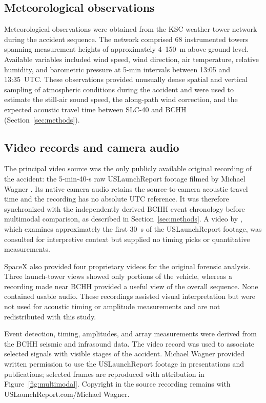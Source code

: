 \documentclass[]{seismica}
\begin{document}
\subsection{Meteorological observations}

Meteorological observations were obtained from the KSC weather-tower network
during the accident sequence. The network comprised 68 instrumented towers
spanning measurement heights of approximately 4--150~m above ground level.
Available variables included wind speed, wind direction, air temperature,
relative humidity, and barometric pressure at 5-min intervals between 13:05
and 13:35~UTC. These observations provided unusually dense spatial and vertical
sampling of atmospheric conditions during the accident and were used to
estimate the still-air sound speed, the along-path wind correction, and the
expected acoustic travel time between SLC-40 and BCHH
(Section~\ref{sec:methods}).


\subsection{Video records and camera audio}

The principal video source was the only publicly available original recording
of the accident: the 5-min-40-s raw USLaunchReport footage filmed by Michael
Wagner \citep{uslaunchreport_amos6_video_2016}. Its native camera audio retains
the source-to-camera acoustic travel time and the recording has no absolute UTC
reference. It was therefore synchronized with the independently derived BCHH
event chronology before multimodal comparison, as described in
Section~\ref{sec:methods}. A video by \citet{manley_spacex_explosion_2016},
which examines approximately the first 30~s of the USLaunchReport footage, was
consulted for interpretive context but supplied no timing picks or quantitative
measurements.

SpaceX also provided four proprietary videos for the original forensic
analysis. Three launch-tower views showed only portions of the vehicle, whereas
a recording made near BCHH provided a useful view of the overall sequence.
None contained usable audio. These recordings assisted visual interpretation
but were not used for acoustic timing or amplitude measurements and are not
redistributed with this study.

Event detection, timing, amplitudes, and array measurements were derived from
the BCHH seismic and infrasound data. The video record was used to associate
selected signals with visible stages of the accident. Michael Wagner provided
written permission to use the USLaunchReport footage in presentations and
publications; selected frames are reproduced with attribution in
Figure~\ref{fig:multimodal}. Copyright in the source recording remains with
USLaunchReport.com/Michael Wagner.
\end{document}
